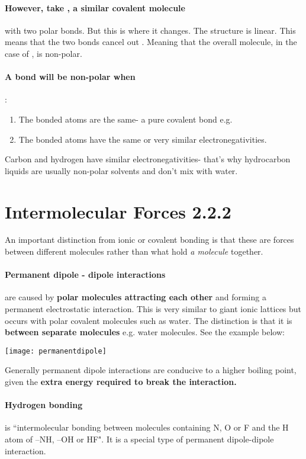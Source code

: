 	\paragraph{However, take , a similar covalent molecule} with two  polar bonds.
	But this is where it changes. The structure is linear.
	This means that the two bonds cancel out .
	Meaning that the overall molecule, in the case of , is non-polar.
    \paragraph{A bond will be non-polar when}: 
    \begin{enumerate}
\item The bonded atoms are the same- a pure covalent bond e.g. 
\item The bonded atoms have the same or very similar electronegativities. 
\end{enumerate}
Carbon and hydrogen have similar electronegativities- that's why hydrocarbon liquids are usually non-polar solvents and don't mix with water.

\section{Intermolecular Forces 2.2.2}
An important distinction from ionic or covalent bonding is that these are forces between different molecules rather than what hold\textit{ a molecule} together.

	\paragraph{Permanent dipole - dipole interactions} are caused by\textbf{ polar molecules attracting each other} and forming a permanent electrostatic interaction.
	This is very similar to giant ionic lattices but occurs with polar covalent molecules such as water.
	The distinction is that it is \textbf{between separate molecules} e.g. water molecules. See the example below:
    \begin{center}
\texttt{[image: permanentdipole]}
\end{center}
	
	Generally permanent dipole interactions are conducive to a higher boiling point, given the \textbf{extra energy required to break the interaction.}
	
	\paragraph{Hydrogen bonding} is ``intermolecular bonding between molecules containing N, O or F and the H atom of –NH, –OH or HF". It is a special type of permanent dipole-dipole interaction. 
	
